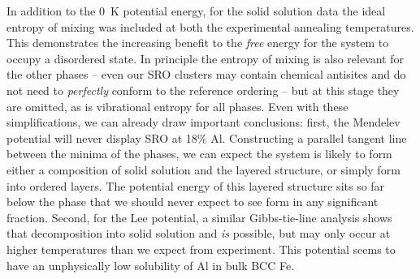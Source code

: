 In addition to the 0~K potential energy, for the solid solution data the ideal entropy of mixing was included at both the experimental annealing temperatures.
This demonstrates the increasing benefit to the \emph{free} energy for the system to occupy a disordered state.
In principle the entropy of mixing is also relevant for the other phases -- even our SRO clusters may contain chemical antisites and do not need to \emph{perfectly} conform to the reference ordering -- but at this stage they are omitted, as is vibrational entropy for all phases.
Even with these simplifications, we can already draw important conclusions: first, the Mendelev potential will never display \DOTHREE SRO at 18\% Al.
Constructing a parallel tangent line between the minima of the phases, we can expect the system is likely to form either a composition of solid solution and the layered structure, or simply form into ordered layers.
The potential energy of this layered structure sits so far below the \DOTHREE phase that we should never expect to see \DOTHREE form in any significant fraction.
Second, for the Lee potential, a similar Gibbs-tie-line analysis shows that decomposition into solid solution and \DOTHREE \emph{is} possible, but may only occur at higher temperatures than we expect from experiment.
This potential seems to have an unphysically low solubility of Al in bulk BCC Fe.

